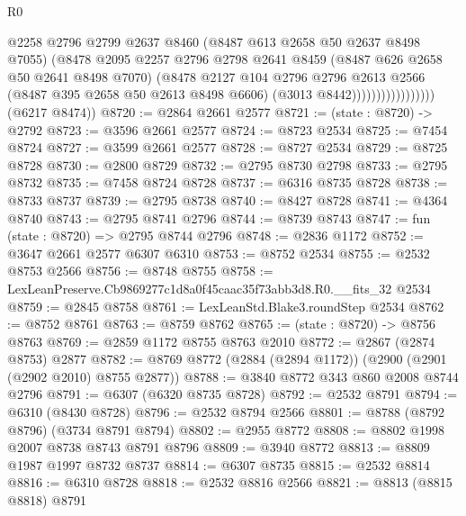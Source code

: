 \begin{lexlean}{R0}
\begin{coremodule}
                                  @2258
                                  @2796
                                  @2799
                                  @2637
                                  @8460
                                  (@8487 @613 @2658 @50 @2637 @8498 @7055)
                                  (@8478
                                    @2095
                                    @2257
                                    @2796
                                    @2798
                                    @2641
                                    @8459
                                    (@8487 @626 @2658 @50 @2641 @8498 @7070)
                                    (@8478
                                      @2127
                                      @104
                                      @2796
                                      @2796
                                      @2613
                                      @2566
                                      (@8487 @395 @2658 @50 @2613 @8498 @6606)
                                      (@3013 @8442)))))))))))))))))
      (@6217 @8474))
@8720 := @2864 @2661 @2577
@8721 := (state : @8720) -> @2792
@8723 := @3596 @2661 @2577
@8724 := @8723 @2534
@8725 := @7454 @8724
@8727 := @3599 @2661 @2577
@8728 := @8727 @2534
@8729 := @8725 @8728
@8730 := @2800 @8729
@8732 := @2795 @8730 @2798
@8733 := @2795 @8732
@8735 := @7458 @8724 @8728
@8737 := @6316 @8735 @8728
@8738 := @8733 @8737
@8739 := @2795 @8738
@8740 := @8427 @8728
@8741 := @4364 @8740
@8743 := @2795 @8741 @2796
@8744 := @8739 @8743
@8747 := fun (state : @8720) => @2795 @8744 @2796
@8748 := @2836 @1172
@8752 := @3647 @2661 @2577 @6307 @6310
@8753 := @8752 @2534
@8755 := @2532 @8753 @2566
@8756 := @8748 @8755
@8758 := LexLeanPreserve.Cb9869277c1d8a0f45caac35f73abb3d8.R0.__fits_32 @2534
@8759 := @2845 @8758
@8761 := LexLeanStd.Blake3.roundStep @2534
@8762 := @8752 @8761
@8763 := @8759 @8762
@8765 := (state : @8720) -> @8756 @8763
@8769 := @2859 @1172 @8755 @8763 @2010
@8772 := @2867 (@2874 @8753) @2877
@8782 := @8769 @8772 (@2884 (@2894 @1172)) (@2900 (@2901 (@2902 @2010) @8755 @2877))
@8788 := @3840 @8772 @343 @860 @2008 @8744 @2796
@8791 := @6307 (@6320 @8735 @8728)
@8792 := @2532 @8791
@8794 := @6310 (@8430 @8728)
@8796 := @2532 @8794 @2566
@8801 := @8788 (@8792 @8796) (@3734 @8791 @8794)
@8802 := @2955 @8772
@8808 := @8802 @1998 @2007 @8738 @8743 @8791 @8796
@8809 := @3940 @8772
@8813 := @8809 @1987 @1997 @8732 @8737
@8814 := @6307 @8735
@8815 := @2532 @8814
@8816 := @6310 @8728
@8818 := @2532 @8816 @2566
@8821 := @8813 (@8815 @8818) @8791

\end{coremodule}
\end{lexlean}
